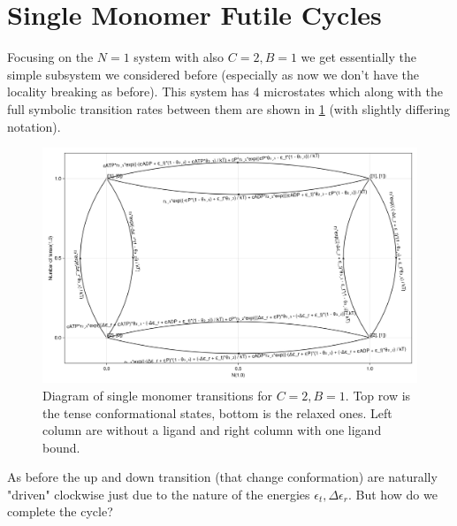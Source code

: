 \documentclass[11pt]{article}
\begin{document}
\section{Single Monomer Futile Cycles}
Focusing on the $N=1$ system with also $C=2,B=1$ we get essentially the simple subsystem we considered before (especially as now we don't have the locality breaking as before).
This system has 4 microstates which along with the full symbolic transition rates between them are shown in \cref{fig:4sTs} (with slightly differing notation).
\begin{figure}[h]
    \includegraphics[width=\textwidth]{../../plots/symgraph_B=1_C=2_N=1_version=2.5.png}
    \caption{
        Diagram of single monomer transitions for $C=2,B=1$.
        Top row is the tense conformational states, bottom is the relaxed ones.
        Left column are without a ligand and right column with one ligand bound.
    }\label{fig:4sTs}
\end{figure}
As before the up and down transition (that change conformation) are naturally "driven" clockwise just due to the nature of the energies $\epsilon_t,\Delta\epsilon_r$.
But how do we complete the cycle?
\end{document}
